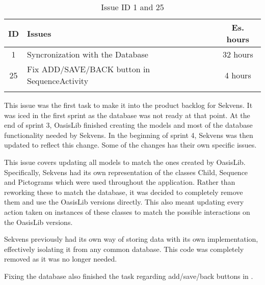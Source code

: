 \begin{longtable} { | c | p{12cm} | c | } 
\hline
	ID 	&	Issues	&		 Es. hours \\\hline
	1	&	Syncronization with the Database	&	32 hours	\\\hline
	25	&	Fix ADD/SAVE/BACK button in SequenceActivity	&	4 hours	\\\hline
\caption{Issue ID 1 and 25}
\label{tab:spr4_syncwithdatabase}
\end{longtable}

This issue was the first task to make it into the product backlog for Sekvens. It was iced in the first sprint as the database was not ready at that point. At the end of sprint 3, OasisLib finished creating the models and most of the database functionality needed by Sekvens. In the beginning of sprint 4, Sekvens was then updated to reflect this change. Some of the changes has their own specific issues.

This issue covers updating all models to match the ones created by OasisLib. Specifically, Sekvens had its own representation of the classes Child, Sequence and Pictograms which were used throughout the application. Rather than reworking these to match the database, it was decided to completely remove them and use the OasisLib versions directly. This also meant updating every action taken on instances of these classes to match the possible interactions on the OasisLib versions.

Sekvens previously had its own way of storing data with its own implementation, effectively isolating it from any common database. This code was completely removed as it was no longer needed.

Fixing the database also finished the task regarding add/save/back buttons in .